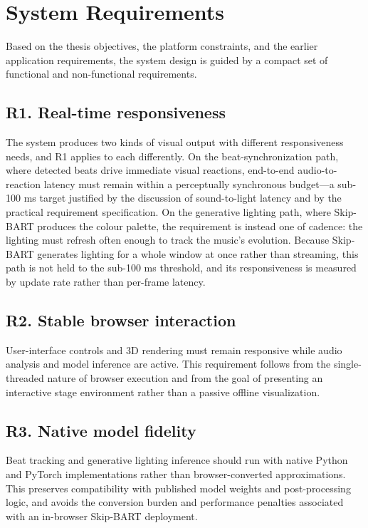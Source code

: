 \section{System Requirements}

Based on the thesis objectives, the  platform constraints, and the earlier application requirements, the system design is guided by a compact set of functional and non-functional requirements.

\subsection{R1. Real-time responsiveness}

The system produces two kinds of visual output with different responsiveness needs, and R1 applies to each differently. On the beat-synchronization path, where detected beats drive immediate visual reactions, end-to-end audio-to-reaction latency must remain within a perceptually synchronous budget---a sub-100 ms target justified by the  discussion of sound-to-light latency and by the practical requirement specification. On the generative lighting path, where Skip-BART produces the colour palette, the requirement is instead one of cadence: the lighting must refresh often enough to track the music's evolution. Because Skip-BART generates lighting for a whole window at once rather than streaming, this path is not held to the sub-100 ms threshold, and its responsiveness is measured by update rate rather than per-frame latency.

\subsection{R2. Stable browser interaction}

User-interface controls and 3D rendering must remain responsive while audio analysis and model inference are active. This requirement follows from the single-threaded nature of browser execution and from the goal of presenting an interactive stage environment rather than a passive offline visualization.

\subsection{R3. Native model fidelity}

Beat tracking and generative lighting inference should run with native Python and PyTorch implementations rather than browser-converted approximations. This preserves compatibility with published model weights and post-processing logic, and avoids the conversion burden and performance penalties associated with an in-browser Skip-BART deployment.

